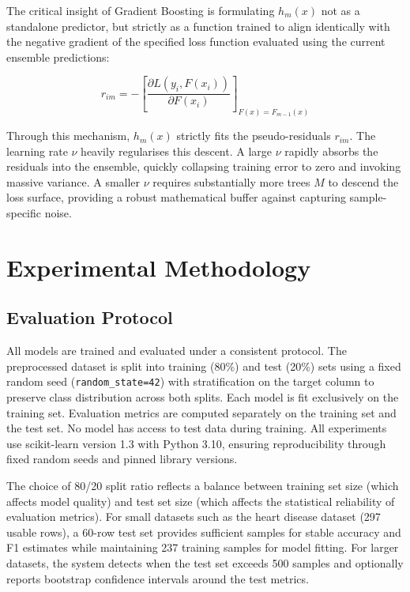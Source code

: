 \documentclass[conference]{IEEEtran}
\begin{document}
The critical insight of Gradient Boosting is formulating $h_m(x)$ not as a standalone predictor, but strictly as a function trained to align identically with the negative gradient of the specified loss function evaluated using the current ensemble predictions:

\begin{equation}
r_{im} = - \left[ \frac{\partial L(y_i, F(x_i))}{\partial F(x_i)} \right]_{F(x) = F_{m-1}(x)}
\end{equation}

Through this mechanism, $h_m(x)$ strictly fits the pseudo-residuals $r_{im}$. The learning rate $\nu$ heavily regularises this descent. A large $\nu$ rapidly absorbs the residuals into the ensemble, quickly collapsing training error to zero and invoking massive variance. A smaller $\nu$ requires substantially more trees $M$ to descend the loss surface, providing a robust mathematical buffer against capturing sample-specific noise.

\section{Experimental Methodology}

\subsection{Evaluation Protocol}

All models are trained and evaluated under a consistent protocol. The preprocessed dataset is split into training (80\%) and test (20\%) sets using a fixed random seed (\texttt{random\_state=42}) with stratification on the target column to preserve class distribution across both splits. Each model is fit exclusively on the training set. Evaluation metrics are computed separately on the training set and the test set. No model has access to test data during training. All experiments use scikit-learn version 1.3 with Python 3.10, ensuring reproducibility through fixed random seeds and pinned library versions.

The choice of 80/20 split ratio reflects a balance between training set size (which affects model quality) and test set size (which affects the statistical reliability of evaluation metrics). For small datasets such as the heart disease dataset (297 usable rows), a 60-row test set provides sufficient samples for stable accuracy and F1 estimates while maintaining 237 training samples for model fitting. For larger datasets, the system detects when the test set exceeds 500 samples and optionally reports bootstrap confidence intervals around the test metrics.
\end{document}
